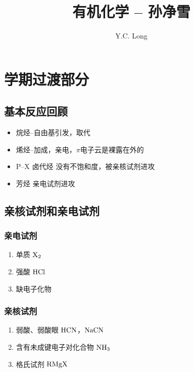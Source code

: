 \documentclass[a4paper]{ctexrep}
\author{Y.C. Long}
\title{有机化学 -- 孙净雪}
\begin{document}
    \maketitle
    \tableofcontents
    

    \chapter*{学期过渡部分}
    \section*{基本反应回顾}
    \begin{itemize}
        \item 烷烃--自由基引发，取代
        \item 烯烃--加成，亲电，$\pi$电子云是裸露在外的
        \item P--X 卤代烃 没有不饱和度，被亲核试剂进攻
        \item 芳烃 亲电试剂进攻
    \end{itemize}

    \section*{亲核试剂和亲电试剂}
    
    \subsection*{亲电试剂}

    \begin{enumerate}
        \item 单质 $\ce{X2}$
        \item 强酸 $\ce{HCl}$
        \item 缺电子化物 
    \end{enumerate}

    \subsection*{亲核试剂}

    \begin{enumerate}
        \item 弱酸、弱酸眼 $\ce{HCN}$，$\ce{NaCN}$
        \item 含有未成键电子对化合物 $\ce{NH3}$
        \item 格氏试剂 $\ce{RMgX}$
    \end{enumerate}
\end{document}
